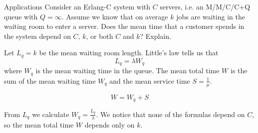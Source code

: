 \begin{problem}{Applications}
Consider an Erlang-C system with \( C \) servers, i.e. an M/M/C/C+Q queue with \( Q = \infty \). Assume we know that on average \( k \) jobs are waiting in the waiting room to enter a server. Does the mean time that a customer spends in the system depend on \( C \), \( k \), or both \( C \) and \( k \)? Explain.
\end{problem}
\begin{solution}
    Let $L_q=k$ be the mean waiting room length. Little's law tells us that
    \[
        L_q=\lambda W_q
    \]
    where $W_q$ is the mean waiting time in the queue. The mean total time $W$ is the sum of the mean waiting time $W_q$ and the mean service time $S=\frac{1}{\mu}$.

    \[
        W = W_q + S
    \]

    From $L_q$ we calculate $W_q=\frac{L_q}{\lambda}$. We notice that none of the formulas depend on $C$, so the mean total time $W$ depends only on $k$.
\end{solution}
